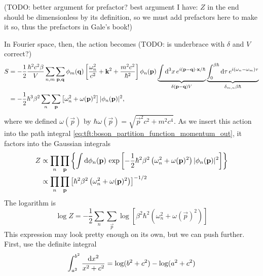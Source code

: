 (TODO: better argument for prefactor? best argument I have: $Z$ in the end should be dimensionless by its definition, so we must add prefactors here to make it so, thus the prefactors in Gale's book!)

In Fourier space, then, the action becomes
(TODO: is underbrace with $\delta$ and $V$ correct?)
\begin{equation}
\begin{split}
	S & = -\frac12 \frac{\hbar^2 c^2 \beta}{V}
	      \sum_{n,m} \sum_{\mathbf{p},\mathbf{q}} 
	  	  \phi_m(\mathbf{q}) 
	  	  \left[ \frac{\omega_n^2}{c^2} + \mathbf{k}^2 + \frac{m^2 c^2}{\hbar^2} \right] 
		  \phi_{n}(\mathbf{p})
		  \underbrace{\int \mathop{}\!\mathrm{d}^3 x \, e^{i (\mathbf{p} - \mathbf{q}) \cdot \mathbf{x} / \hbar}}_{\delta(\mathbf{p}-\mathbf{q}) V}
	      \underbrace{\int_0^{\beta \hbar} \mathop{}\!\mathrm{d} \tau \, e^{i (\omega_n - \omega_m) \tau}}_{\delta_{m,n} \beta \hbar}
		  \\
	  & = -\frac12 \hbar^3 \beta^2
	      \sum_n \sum_{\mathbf{p}}
	  	  \left[ \omega_n^2 + \omega(\mathbf{p})^2 \right] 
		  \lvert \phi_{n}(\mathbf{p}) \rvert^2 ,
\end{split}
\end{equation}
where we defined $\omega(\vec{p})$ by $\hbar \omega(\vec{p}) = \sqrt{\vec{p}^2 c^2 + m^2 c^4}$.
As we insert this action into the path integral \eqref{eq:tft:boson_partition_function_momentum_out}, it factors into the Gaussian integrals
\begin{equation}
\begin{split}
	Z & \propto 
	\prod_{n} \prod_{\mathbf{p}}
	\left\{
		\int \mathop{}\!\mathrm{d} \phi_n(\mathbf{p}) \,
		\exp \left[
			-\frac12 \hbar^2 \beta^2 \left(
				\omega_n^2 + \omega(\mathbf{p})^2
			\right)
			\lvert \phi_n(\mathbf{p}) \rvert^2
		\right]
	\right\} \\
	  & \propto
	\prod_{n} \prod_{\mathbf{p}} \left[ 
		\hbar^2 \beta^2 \left( 
			\omega_n^2 + \omega(\mathbf{p})^2
		\right)
	\right]^{-1/2}
\end{split}
\label{eq:tft:boson_gaussian_integral}
\end{equation}
The logarithm is
\begin{equation}
	\log Z = -\frac12 \sum_n \sum_\vec{p} 
	         \log \left[ \beta^2 \hbar^2 \left( \omega_n^2 + \omega(\vec{p})^2 \right) \right]
\end{equation}
This expression may look pretty enough on its own, but we can push further.
First, use the definite integral
\begin{equation}
	\int_{a^2}^{b^2} \frac{\mathop{}\!\mathrm{d} x^2}{x^2 + c^2} = \log(b^2 + c^2) - \log(a^2 + c^2)
\label{eq:tft:integral_trick}
\end{equation}
